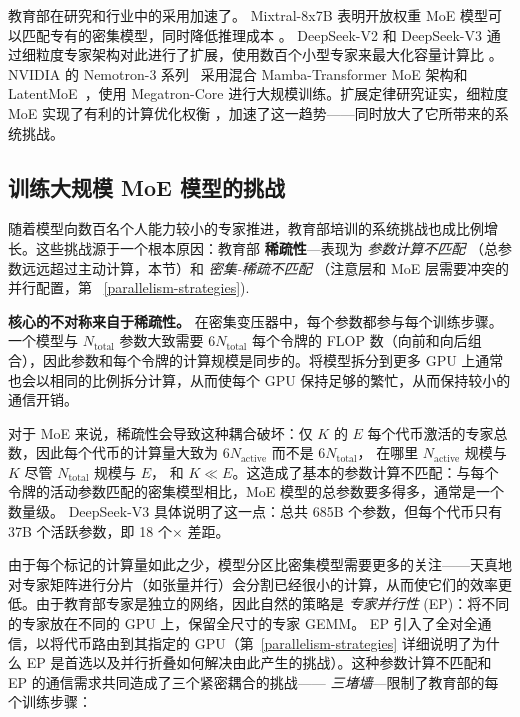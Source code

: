 教育部在研究和行业中的采用加速了。 Mixtral-8x7B 表明开放权重 MoE 模型可以匹配专有的密集模型，同时降低推理成本 \cite{jiang2024mixtralexperts}。 DeepSeek-V2 和 DeepSeek-V3 通过细粒度专家架构对此进行了扩展，使用数百个小型专家来最大化容量计算比 \cite{dai2024deepseekmoe,deepseekai2024deepseekv2strongeconomicalefficient,deepseekai2025deepseekv3technicalreport}。 NVIDIA 的 Nemotron-3 系列~\cite{nvidia2025nemotron3} 采用混合 Mamba-Transformer MoE 架构和 LatentMoE~\cite{elango2026latentmoe}，使用 Megatron-Core 进行大规模训练。扩展定律研究证实，细粒度 MoE 实现了有利的计算优化权衡 \cite{krajewski2024scaling,ludziejewski2025jointmoescalinglaws}，加速了这一趋势——同时放大了它所带来的系统挑战。

\subsection{训练大规模 MoE 模型的挑战}\label{sec:challenges}

随着模型向数百名个人能力较小的专家推进，教育部培训的系统挑战也成比例增长。这些挑战源于一个根本原因：教育部 \textbf{稀疏性}---表现为 \emph{参数计算不匹配} （总参数远远超过主动计算，本节）和 \emph{密集-稀疏不匹配} （注意层和 MoE 层需要冲突的并行配置，第 ~\ref{parallelism-strategies}).

\textbf{核心的不对称来自于稀疏性。} 在密集变压器中，每个参数都参与每个训练步骤。一个模型与 $N_{\text{total}}$ 参数大致需要 $6 N_{\text{total}}$ 每个令牌的 FLOP 数（向前和向后组合），因此参数和每个令牌的计算规模是同步的。将模型拆分到更多 GPU 上通常也会以相同的比例拆分计算，从而使每个 GPU 保持足够的繁忙，从而保持较小的通信开销。

对于 MoE 来说，稀疏性会导致这种耦合破坏：仅 $K$ 的 $E$ 每个代币激活的专家总数，因此每个代币的计算量大致为 $6 N_{\text{active}}$ 而不是 $6 N_{\text{total}}$， 在哪里 $N_{\text{active}}$ 规模与 $K$ 尽管 $N_{\text{total}}$ 规模与 $E$， 和 $K \ll E$。这造成了基本的参数计算不匹配：与每个令牌的活动参数匹配的密集模型相比，MoE 模型的总参数要多得多，通常是一个数量级。 DeepSeek-V3 具体说明了这一点：总共 685B 个参数，但每个代币只有 37B 个活跃参数，即 18 个$\times$ 差距。

由于每个标记的计算量如此之少，模型分区比密集模型需要更多的关注——天真地对专家矩阵进行分片（如张量并行）会分割已经很小的计算，从而使它们的效率更低。由于教育部专家是独立的网络，因此自然的策略是 \emph{专家并行性} (EP)：将不同的专家放在不同的 GPU 上，保留全尺寸的专家 GEMM。 EP 引入了全对全通信，以将代币路由到其指定的 GPU（第~\ref{parallelism-strategies} 详细说明了为什么 EP 是首选以及并行折叠如何解决由此产生的挑战）。这种参数计算不匹配和 EP 的通信需求共同造成了三个紧密耦合的挑战—— \emph{三堵墙}---限制了教育部的每个训练步骤：

